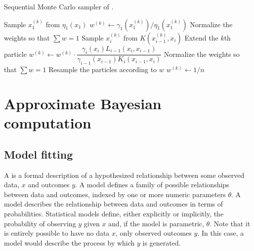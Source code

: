 \begin{algorithm}
  \caption{Sequential Monte Carlo sampler of \textcite{del2006sequential}.}
  \begin{algorithmic}
      \State Sample $x_1^{(k)}$ from $\eta_1(x_1)$
      \State $w^{(k)} \gets \gamma_1(x_1^{(k)}) / \eta_1(x_1^{(k)})$
      \State Normalize the weights so that $\sum w = 1$
    \EndFor
        \State Sample $x_i^{(k)}$ from $K(x_{i-1}^{(k)}, x_i)$
        \Comment Extend the $k$th particle
        \State $w^{(k)} \gets w^{(k)} \cdot \dfrac{\gamma_i(x_i) L_{i-1}(x_i, x_{i-1})}{\gamma_{i-1}(x_{i-1}) K_i(x_{i-1}, x_i)}$
      \EndFor
      \State Normalize the weights so that $\sum w = 1$
        \State Resample the particles according to $w$
          \State $w^{(k)} \gets 1/n$
        \EndFor
      \EndIf
    \EndFor
  \end{algorithmic}
  \label{alg:smcsamp}
\end{algorithm}

\section{Approximate Bayesian computation}
\label{sec:abc}


\subsection{Model fitting}
\label{subsec:mfit}

A  is a formal description of a hypothesized
relationship between some observed data, $x$ and outcomes $y$. A
 model defines a family of possible relationships between data
and outcomes, indexed by one or more numeric parameters $\theta$. A
 model describes the relationship between data and outcomes
in terms of probabilities. Statistical models define, either explicitly or
implicitly, the probability of observing $y$ given $x$ and, if the model is
parametric, $\theta$. Note that it is entirely possible to have no data $x$,
only observed outcomes $y$. In this case, a model would describe the process by
which $y$ is generated.

